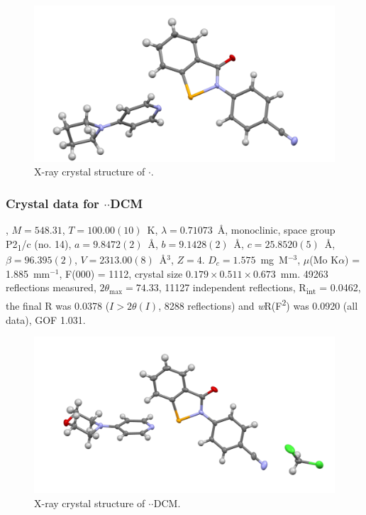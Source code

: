 \begin{refsection}
\begin{figure}
  \includegraphics[width=0.6\linewidth]{Figures/ebs-4cn-pyrrol-xtal.pdf}
  \caption{X-ray crystal structure of \texorpdfstring{$\cdot$}{C23 H20 N4 O Se}.}
\end{figure}

\subsubsection{Crystal data for \texorpdfstring{$\cdot$$\cdot$DCM}{C24 H22 Cl2 N4 O2 Se}}
, $M=548.31$, $T=100.00(10)$~K, $\lambda=0.71073$~\AA, monoclinic, space group P2\textsubscript{1}/c (no. 14), $a = 9.8472(2)$~\AA, $b = 9.1428(2)$~\AA, $c = 25.8520(5)$~\AA, $\beta = 96.395(2)$\degree, $V = 2313.00(8)$~\AA$^{3}$, $Z = 4$. $D_{c}= 1.575$~mg~M$^{-3}$, $\mu$(Mo K$\alpha$) = 1.885~mm$^{-1}$, F(000) = 1112, crystal size $0.179 \times 0.511 \times 0.673$~mm. 49263 reflections measured, $2\theta_{\mathrm{max}}=74.33$\degree, 11127 independent reflections, R\textsubscript{int} = 0.0462, the final R was 0.0378 ($I > 2\theta(I)$, 8288 reflections) and \emph{w}R(F\textsuperscript{2}) was 0.0920 (all data), GOF 1.031.

\begin{figure}
  \includegraphics[width=0.6\linewidth]{Figures/ebs-4cn-morph-dcm-xtal.pdf}
  \caption{X-ray crystal structure of \texorpdfstring{$\cdot$$\cdot$DCM}{C24 H22 Cl2 N4 O2 Se}.}
\end{figure}


\end{refsection}
